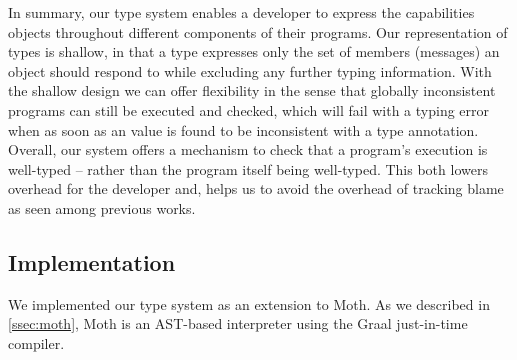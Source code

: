 In summary, our type system enables a developer to express
the capabilities objects throughout different components of 
their programs.
Our representation of types is shallow,
in that a type expresses only the set of members (messages) an object
should respond to while excluding any further typing information. 
With the shallow design we can offer flexibility in the sense that
globally inconsistent programs can still be executed and checked,
which will fail with a typing error when as soon as an value is found
to be inconsistent with a type annotation. 
Overall, our system offers a mechanism to check that a program's execution
is well-typed 
-- rather than the program itself being well-typed.
This both lowers overhead for the developer and, 
helps us to avoid the overhead of tracking blame 
as seen among previous works.

\subsection{Implementation} 
\label{ssec:implementation} 


We implemented our type system as an extension to Moth.
As we described in \cref{ssec:moth},
Moth is an AST-based interpreter
using the Graal just-in-time compiler\citep{Wurthinger:2017:PPE}.


